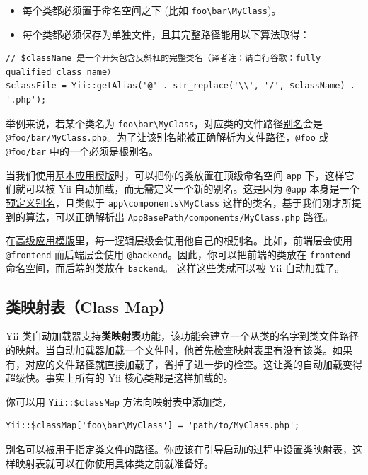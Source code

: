 \begin{itemize}
\item 每个类都必须置于命名空间之下 (比如 \lstinline|foo\bar\MyClass|)。
\item 每个类都必须保存为单独文件，且其完整路径能用以下算法取得：
\end{itemize}
\lstset{language=php}\begin{lstlisting}
// $className 是一个开头包含反斜杠的完整类名（译者注：请自行谷歌：fully qualified class name）
$classFile = Yii::getAlias('@' . str_replace('\\', '/', $className) . '.php');
\end{lstlisting}
举例来说，若某个类名为 \lstinline|foo\bar\MyClass|，对应类的文件路径\hyperref[concept-aliases.md]{别名}会是 \lstinline|@foo/bar/MyClass.php|。为了让该别名能被正确解析为文件路径，\lstinline|@foo| 或 \lstinline|@foo/bar|
中的一个必须是\hyperref[concept-aliases.md::defining-aliases]{根别名}。

当我们使用\hyperref[start-basic.md]{基本应用模版}时，可以把你的类放置在顶级命名空间 \lstinline|app| 下，这样它们就可以被 Yii 自动加载，而无需定义一个新的别名。这是因为 \lstinline|@app| 本身是一个\hyperref[concept-aliases.md::predefined-aliases]{预定义别名}，且类似于 \lstinline|app\components\MyClass| 这样的类名，基于我们刚才所提到的算法，可以正确解析出 \lstinline|AppBasePath/components/MyClass.php| 路径。

在\hyperref[tutorial-advanced-app.md]{高级应用模版}里，每一逻辑层级会使用他自己的根别名。比如，前端层会使用 \lstinline|@frontend| 而后端层会使用 \lstinline|@backend|。因此，你可以把前端的类放在 \lstinline|frontend| 命名空间，而后端的类放在 \lstinline|backend|。 这样这些类就可以被 Yii 自动加载了。

\subsection{类映射表（Class Map） \label{concept-autoloading.md::class-map}}
Yii 类自动加载器支持\textbf{类映射表}功能，该功能会建立一个从类的名字到类文件路径的映射。当自动加载器加载一个文件时，他首先检查映射表里有没有该类。如果有，对应的文件路径就直接加载了，省掉了进一步的检查。这让类的自动加载变得超级快。事实上所有的 Yii 核心类都是这样加载的。

你可以用 \lstinline|Yii::$classMap| 方法向映射表中添加类，

\lstset{language=php}\begin{lstlisting}
Yii::$classMap['foo\bar\MyClass'] = 'path/to/MyClass.php';
\end{lstlisting}
\hyperref[concept-aliases.md]{别名}可以被用于指定类文件的路径。你应该在\hyperref[runtime-bootstrapping.md]{引导启动}的过程中设置类映射表，这样映射表就可以在你使用具体类之前就准备好。

